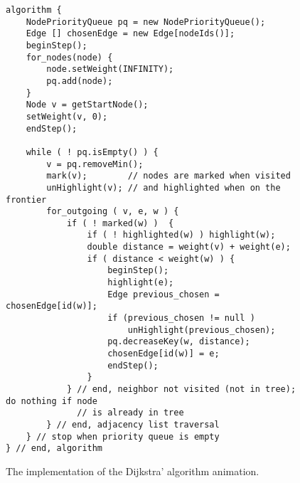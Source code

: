 \begin{figure}

\small
\begin{verbatim}
algorithm {
    NodePriorityQueue pq = new NodePriorityQueue();
    Edge [] chosenEdge = new Edge[nodeIds()]; 
    beginStep();
    for_nodes(node) {
        node.setWeight(INFINITY);
        pq.add(node);
    }
    Node v = getStartNode();
    setWeight(v, 0);
    endStep();

    while ( ! pq.isEmpty() ) {
        v = pq.removeMin();
        mark(v);        // nodes are marked when visited
        unHighlight(v); // and highlighted when on the frontier
        for_outgoing ( v, e, w ) {
            if ( ! marked(w) )  {
                if ( ! highlighted(w) ) highlight(w);
                double distance = weight(v) + weight(e);
                if ( distance < weight(w) ) {
                    beginStep();
                    highlight(e);
                    Edge previous_chosen = chosenEdge[id(w)];
                    if (previous_chosen != null )
                        unHighlight(previous_chosen);
                    pq.decreaseKey(w, distance);
                    chosenEdge[id(w)] = e;
                    endStep();
                }
            } // end, neighbor not visited (not in tree); do nothing if node
              // is already in tree
        } // end, adjacency list traversal
    } // stop when priority queue is empty
} // end, algorithm
\end{verbatim}



\caption{The implementation of the Dijkstra' algorithm animation.}
\label{fig:dijkstra}
\end{figure}
